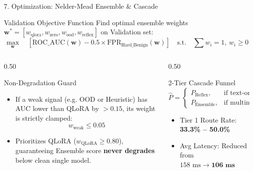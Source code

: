 \documentclass[aspectratio=169, 10pt]{beamer}
\begin{document}
\begin{frame}{7. Optimization: Nelder-Mead Ensemble \& Cascade}
    \begin{block}{Validation Objective Function}
        Find optimal ensemble weights $\mathbf{w}^* = [w_{\text{qlora}}, w_{\text{zero}}, w_{\text{ood}}, w_{\text{reflex}}]$ on Validation set:
        $$\max_{\mathbf{w}} \quad \left[\text{ROC\_AUC}(\mathbf{w}) - 0.5 \times \text{FPR}_{\text{Hard\_Benign}}(\mathbf{w})\right] \quad \text{s.t.} \quad \sum w_i = 1, \ w_i \ge 0$$
    \end{block}

    \begin{columns}[T]
        \begin{column}{0.50\textwidth}
            \begin{exampleblock}{Non-Degradation Guard}
                \begin{itemize}
                    \item If a weak signal (e.g. OOD or Heuristic) has AUC lower than QLoRA by $> 0.15$, its weight is strictly clamped:
                    $$w_{\text{weak}} \le 0.05$$
                    \item Prioritizes QLoRA ($w_{\text{QLoRA}} \ge 0.80$), guaranteeing Ensemble score \textbf{never degrades} below clean single model.
                \end{itemize}
            \end{exampleblock}
        \end{column}
        \begin{column}{0.50\textwidth}
            \begin{block}{2-Tier Cascade Funnel}
                $$\hat{P} = \begin{cases} 
                P_{\text{Reflex}}, & \text{if text-only and } (P < 0.12 \text{ or } P > 0.88) \\
                P_{\text{Ensemble}}, & \text{if multimodal image or borderline}
                \end{cases}$$
                \begin{itemize}
                    \item Tier 1 Route Rate: \textbf{33.3\% -- 50.0\%}
                    \item Avg Latency: Reduced from $158\text{ ms} \to \mathbf{106\text{ ms}}$
                \end{itemize}
            \end{block}
        \end{column}
    \end{columns}
\end{frame}
\end{document}
